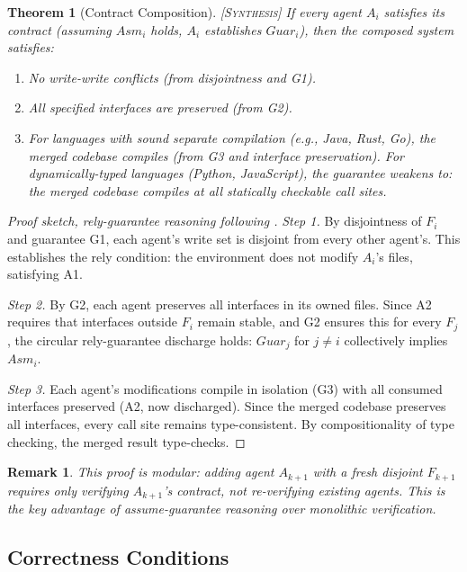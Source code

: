 \documentclass[11pt, a4paper, logo, copyright]{googledeepmind}
\newtheorem{theorem}{Theorem}[section]
\newtheorem*{remark}{Remark}
\newcommand{\synthesis}{\textsc{[Synthesis]}}
\begin{document}
\begin{theorem}[Contract Composition] \synthesis{}
\label{thm:composition}
If every agent $A_i$ satisfies its contract (assuming $Asm_i$ holds, $A_i$ establishes $Guar_i$), then the composed system satisfies:
\begin{enumerate}[nosep]
  \item No write-write conflicts (from disjointness and G1).
  \item All specified interfaces are preserved (from G2).
  \item For languages with sound separate compilation (e.g., Java, Rust, Go), the merged codebase compiles (from G3 and interface preservation). For dynamically-typed languages (Python, JavaScript), the guarantee weakens to: the merged codebase compiles at all statically checkable call sites.
\end{enumerate}
\end{theorem}

\begin{proof}[Proof sketch, rely-guarantee reasoning following \citet{Jones1983}]
\textit{Step 1.}
By disjointness of $F_i$ and guarantee G1, each agent's write set is disjoint from every other agent's.
This establishes the rely condition: the environment does not modify $A_i$'s files, satisfying A1.

\textit{Step 2.}
By G2, each agent preserves all interfaces in its owned files.
Since A2 requires that interfaces outside $F_i$ remain stable, and G2 ensures this for every $F_j$, the circular rely-guarantee discharge holds: $Guar_j$ for $j \neq i$ collectively implies $Asm_i$.

\textit{Step 3.}
Each agent's modifications compile in isolation (G3) with all consumed interfaces preserved (A2, now discharged).
Since the merged codebase preserves all interfaces, every call site remains type-consistent.
By compositionality of type checking, the merged result type-checks.
\end{proof}

\begin{remark}
This proof is modular: adding agent $A_{k+1}$ with a fresh disjoint $F_{k+1}$ requires only verifying $A_{k+1}$'s contract, not re-verifying existing agents.
This is the key advantage of assume-guarantee reasoning over monolithic verification.
\end{remark}

\subsection{Correctness Conditions}
\end{document}
